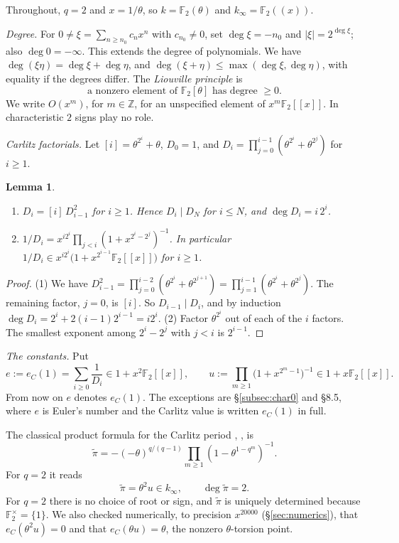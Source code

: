 \documentclass[11pt]{amsart}
\newtheorem{lemma}[theorem]{Lemma}
\theoremstyle{remark}
\numberwithin{equation}{section}
\newcommand{\F}{\mathbb{F}}
\newcommand{\Z}{\mathbb{Z}}
\newcommand{\kinf}{k_\infty}
\newcommand{\pit}{\tilde\pi}
\newcommand{\eC}{e_C}
\begin{document}
Throughout, $q=2$ and $x=1/\theta$, so $k=\F_2(\theta)$ and $\kinf=\F_2((x))$.

\emph{Degree.} For $0\ne\xi=\sum_{n\ge n_0}c_nx^n$ with $c_{n_0}\ne0$, set $\deg\xi=-n_0$ and $|\xi|=2^{\deg\xi}$; also $\deg0=-\infty$. This extends the degree of polynomials. We have $\deg(\xi\eta)=\deg\xi+\deg\eta$, and $\deg(\xi+\eta)\le\max(\deg\xi,\deg\eta)$, with equality if the degrees differ. The \emph{Liouville principle} is
\begin{equation}\label{eq:liouville}
\text{a nonzero element of } \F_2[\theta] \text{ has degree } \ge0 .
\end{equation}
We write $O(x^m)$, for $m\in\Z$, for an unspecified element of $x^m\F_2[[x]]$. In characteristic $2$ signs play no role.

\emph{Carlitz factorials.} Let $[i]=\theta^{2^i}+\theta$, $D_0=1$, and $D_i=\prod_{j=0}^{i-1}(\theta^{2^i}+\theta^{2^j})$ for $i\ge1$.

\begin{lemma}\label{lem:D}
\begin{enumerate}
\item[(1)] $D_i=[i]\,D_{i-1}^2$ for $i\ge1$. Hence $D_i\mid D_N$ for $i\le N$, and $\deg D_i=i\,2^i$.
\item[(2)] $1/D_i=x^{i2^i}\prod_{j<i}(1+x^{2^i-2^j})^{-1}$. In particular $1/D_i\in x^{i2^i}\bigl(1+x^{2^{i-1}}\F_2[[x]]\bigr)$ for $i\ge1$.
\end{enumerate}
\end{lemma}

\begin{proof}
(1) We have $D_{i-1}^2=\prod_{j=0}^{i-2}(\theta^{2^i}+\theta^{2^{j+1}})=\prod_{j=1}^{i-1}(\theta^{2^i}+\theta^{2^j})$. The remaining factor, $j=0$, is $[i]$. So $D_{i-1}\mid D_i$, and by induction $\deg D_i=2^i+2(i-1)2^{i-1}=i2^i$. (2) Factor $\theta^{2^i}$ out of each of the $i$ factors. The smallest exponent among $2^i-2^j$ with $j<i$ is $2^{i-1}$.
\end{proof}

\emph{The constants.} Put
\[
e:=\eC(1)=\sum_{i\ge0}\frac{1}{D_i}\in1+x^2\F_2[[x]],\qquad u:=\prod_{m\ge1}\bigl(1+x^{2^m-1}\bigr)^{-1}\in1+x\F_2[[x]].
\]
From now on $e$ denotes $\eC(1)$. The exceptions are \S\ref{subsec:char0} and \S8.5, where $e$ is Euler's number and the Carlitz value is written $\eC(1)$ in full.

The classical product formula for the Carlitz period \cite{Car35}, \cite{Gos96}, \cite[(2)]{Pel17} is
\[
\pit=-(-\theta)^{q/(q-1)}\prod_{m\ge1}(1-\theta^{1-q^m})^{-1}.
\]
For $q=2$ it reads
\begin{equation}\label{eq:pi}
\pit=\theta^2u\in\kinf,\qquad\deg\pit=2 .
\end{equation}
For $q=2$ there is no choice of root or sign, and $\pit$ is uniquely determined because $\F_2^\times=\{1\}$. We also checked numerically, to precision $x^{20000}$ (\S\ref{sec:numerics}), that $\eC(\theta^2u)=0$ and that $\eC(\theta u)=\theta$, the nonzero $\theta$-torsion point.
\end{document}
